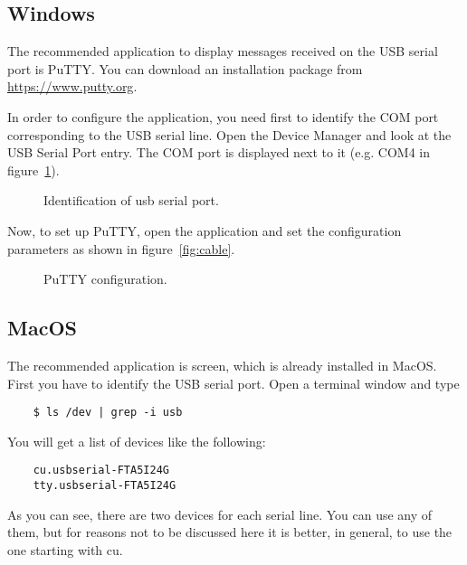 \subsection{Windows}

The recommended application to display messages received on the USB serial port is PuTTY. You can download an installation package from \url{https://www.putty.org}.

In order to configure the application, you need first to identify the COM port corresponding to the USB serial line. Open the Device Manager and look at the USB Serial Port entry. The COM port is displayed next to it (e.g. COM4 in figure~\ref{fig:com}).

\begin{figure}[hbtp!]
            \caption{Identification of usb serial port.}
            \label{fig:com}
\end{figure}

Now, to set up PuTTY, open the application and set the configuration parameters as shown in figure~\ref{fig:cable}.

\begin{figure}[hbtp!]
            \caption{PuTTY configuration.}
            \label{fig:putty}
\end{figure}

\subsection{MacOS}
The recommended application is screen, which is already installed in MacOS.
First you have to identify the USB serial port. Open a terminal window and type

\begin{BVerbatim}
	$ ls /dev | grep -i usb
\end{BVerbatim}

You will get a list of devices like the following:

\begin{BVerbatim}
	cu.usbserial-FTA5I24G
	tty.usbserial-FTA5I24G
\end{BVerbatim}

As you can see, there are two devices for each serial line. You can use any of them, but for reasons not to be discussed here it is better, in general, to use the one starting with cu.

